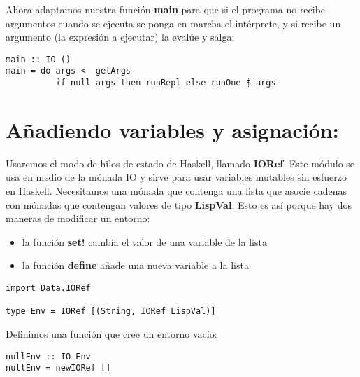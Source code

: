 Ahora adaptamos nuestra funci\'on \textbf{main} para que si el programa no recibe argumentos cuando se ejecuta se ponga en marcha el int\'erprete, y si recibe un argumento (la expresi\'on a ejecutar) la eval\'ue y salga:\\

\begin{minipage}{\linewidth}
\begin{footnotesize}
\begin{lstlisting}[frame=single]
main :: IO ()
main = do args <- getArgs
          if null args then runRepl else runOne $ args
\end{lstlisting}
\end{footnotesize}
\end{minipage}

\section{A\~{n}adiendo variables y asignaci\'on:}
\label{3:sec6}

Usaremos el modo de hilos de estado de Haskell, llamado \textbf{IORef}. Este m\'odulo se usa en medio de la m\'onada IO y sirve para usar variables mutables sin esfuerzo en Haskell. Necesitamos una m\'onada que contenga una lista que asocie cadenas con m\'onadas que contengan valores de tipo \textbf{LispVal}. Esto es as\'i porque hay dos maneras de modificar un entorno:

\begin{itemize}
  \item la funci\'on \textbf{set!} cambia el valor de una variable de la lista
  \item la funci\'on \textbf{define} a\~{n}ade una nueva variable a la lista
\end{itemize}

\begin{minipage}{\linewidth}
\begin{footnotesize}
\begin{lstlisting}[frame=single]
import Data.IORef

type Env = IORef [(String, IORef LispVal)]
\end{lstlisting}
\end{footnotesize}
\end{minipage}

Definimos una funci\'on que cree un entorno vac\'io:\\

\begin{minipage}{\linewidth}
\begin{footnotesize}
\begin{lstlisting}[frame=single]
nullEnv :: IO Env
nullEnv = newIORef []
\end{lstlisting}
\end{footnotesize}
\end{minipage}


